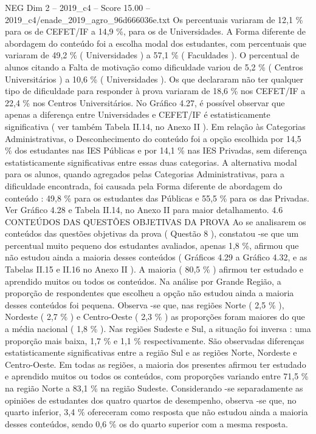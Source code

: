 \begin{textsample}{NEG Dim 2 – 2019\_c4 – Score 15.00 – 2019\_c4/enade\_2019\_agro\_96d666036e.txt}
Os percentuais variaram de 12,1 \% para os de CEFET/IF a 14,9 \%, para os de Universidades.
A Forma diferente de abordagem do conteúdo foi a escolha modal dos estudantes, com percentuais que variaram de 49,2 \% ( Universidades ) a 57,1 \% ( Faculdades ).
O percentual de alunos citando a Falta de motivação como dificuldade variou de 5,2 \% ( Centros Universitários ) a 10,6 \% ( Universidades ).
Os que declararam não ter qualquer tipo de dificuldade para responder à prova variaram de 18,6 \% nos CEFET/IF a 22,4 \% nos Centros Universitários.
No Gráfico 4.27, é possível observar que apenas a diferença entre Universidades e CEFET/IF é estatisticamente significativa ( ver também Tabela II.14, no Anexo II ).
Em relação às Categorias Administrativas, o Desconhecimento do conteúdo foi a opção escolhida por 14,5 \% dos estudantes nas IES Públicas e por 14,1 \% nas IES Privadas, sem diferença estatisticamente significativas entre essas duas categorias.
A alternativa modal para os alunos, quando agregados pelas Categorias Administrativas, para a dificuldade encontrada, foi causada pela Forma diferente de abordagem do conteúdo : 49,8 \% para os estudantes das Públicas e 55,5 \% para os das Privadas.
Ver Gráfico 4.28 e Tabela II.14, no Anexo II para maior detalhamento. 4.6 CONTEÚDOS DAS QUESTÕES OBJETIVAS DA PROVA Ao se analisarem os conteúdos das questões objetivas da prova ( Questão 8 ), constatou -se que um percentual muito pequeno dos estudantes avaliados, apenas 1,8 \%, afirmou que não estudou ainda a maioria desses conteúdos ( Gráficos 4.29 a Gráfico 4.32, e as Tabelas II.15 e II.16 no Anexo II ).
A maioria ( 80,5 \% ) afirmou ter estudado e aprendido muitos ou todos os conteúdos.
Na análise por Grande Região, a proporção de respondentes que escolheu a opção não estudou ainda a maioria desses conteúdos foi pequena.
Observa -se que, nas regiões Norte ( 2,5 \% ), Nordeste ( 2,7 \% ) e Centro-Oeste ( 2,3 \% ) as proporções foram maiores do que a média nacional ( 1,8 \% ).
Nas regiões Sudeste e Sul, a situação foi inversa : uma proporção mais baixa, 1,7 \% e 1,1 \% respectivamente.
São observadas diferenças estatisticamente significativas entre a região Sul e as regiões Norte, Nordeste e Centro-Oeste.
Em todas as regiões, a maioria dos presentes afirmou ter estudado e aprendido muitos ou todos os conteúdos, com proporções variando entre 71,5 \% na região Norte a 83,1 \% na região Sudeste.
Considerando -se separadamente as opiniões de estudantes dos quatro quartos de desempenho, observa -se que, no quarto inferior, 3,4 \% ofereceram como resposta que não estudou ainda a maioria desses conteúdos, sendo 0,6 \% os do quarto superior com a mesma resposta.

\end{textsample}
